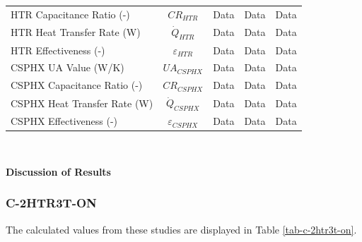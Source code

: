 \begin{paracol}{2}
\begin{specialtable}[H]
\begin{tabular}{lcccc}
    HTR Capacitance Ratio (-)	&	$CR_{HTR}$	&	Data	&	Data	&	Data	\\
    HTR Heat Transfer Rate (W)	&	$\dot{Q}_{HTR}$	&	Data	&	Data	&	Data	\\
    HTR Effectiveness (-)	&	$\varepsilon_{HTR}$	&	Data	&	Data	&	Data	\\
    CSPHX UA Value (W/K)	&	$UA_{CSPHX}$	&	Data	&	Data	&	Data	\\
    CSPHX Capacitance Ratio (-)	&	$CR_{CSPHX}$	&	Data	&	Data	&	Data	\\
    CSPHX Heat Transfer Rate (W)	&	$\dot{Q}_{CSPHX}$	&	Data	&	Data	&	Data	\\
    CSPHX Effectiveness (-)	&	$\varepsilon_{CSPHX}$	&	Data	&	Data	&	Data	\\
    \bottomrule
    \end{tabular}\\
\end{specialtable}

\textbf{Discussion of Results}


\subsubsection{C-2HTR3T-ON}

The calculated values from these studies are displayed in Table \ref{tab-c-2htr3t-on}.


\end{paracol}
